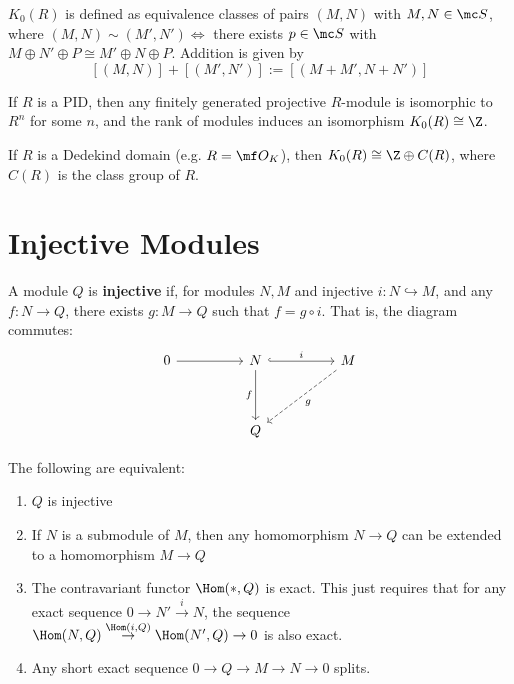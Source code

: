 \begin{defn}
    $K_0(R)$ is defined as equivalence classes of pairs $(M,N)$ with $M,N \in \mc S$, where $(M,N) \sim (M',N') \iff$ there exists $p \in \mc S$ with $M \oplus N' \oplus P \cong M' \oplus N \oplus P$. Addition is given by
    $$[(M,N)] + [(M',N')] := [(M+M',N+N')]$$
\end{defn}

\begin{rmk}
    If $R$ is a PID, then any finitely generated projective $R$-module is isomorphic to $R^n$ for some $n$, and the rank of modules induces an isomorphism $K_0(R) \cong \Z$.

    If $R$ is a Dedekind domain (e.g. $R= \mf O_K$), then $K_0(R) \cong \Z \oplus C(R)$, where $C(R)$ is the class group of $R$.
\end{rmk}

\section{Injective Modules}

\begin{defn}
    A module $Q$ is \textbf{injective} if, for modules $N,M$ and injective $i:N \hookrightarrow M$, and any $f:N\to Q$, there exists $g:M \to Q$ such that $f = g \circ i$. That is, the diagram commutes:
    \[\begin{tikzcd}[ampersand replacement=\&]
    	0 \&\& N \&\& M \\
    	\\
    	\&\& Q
    	\arrow[from=1-1, to=1-3]
    	\arrow["i", hook, from=1-3, to=1-5]
    	\arrow["f"', from=1-3, to=3-3]
    	\arrow["g", dashed, from=1-5, to=3-3]
    \end{tikzcd}\]
\end{defn}

\begin{prop}
    The following are equivalent:
    \begin{enumerate}
        \item $Q$ is injective
        \item If $N$ is a submodule of $M$, then any homomorphism $N \to Q$ can be extended to a homomorphism $M \to Q$
        \item The contravariant functor $\Hom(*,Q)$ is exact. This just requires that for any exact sequence $0 \to N' \overset{i}{\to}N$, the sequence $\Hom(N,Q) \overset{\Hom(i,Q)}{\to}\Hom(N',Q) \to 0$ is also exact.
        \item Any short exact sequence $0 \to Q \to M \to N \to 0$ splits.
    \end{enumerate}
\end{prop}

